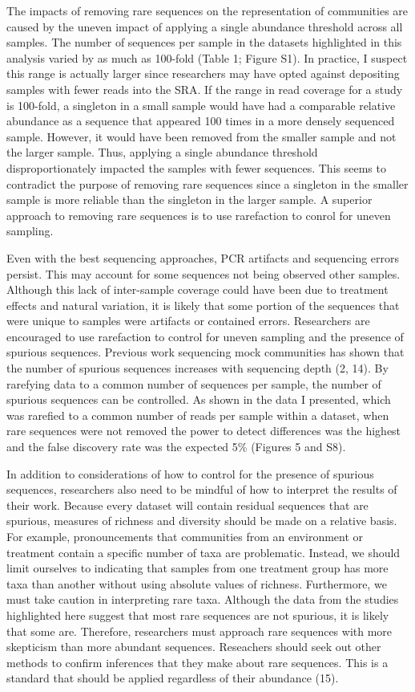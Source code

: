 \documentclass[
]{article}
\begin{document}
The impacts of removing rare sequences on the representation of
communities are caused by the uneven impact of applying a single
abundance threshold across all samples. The number of sequences per
sample in the datasets highlighted in this analysis varied by as much as
100-fold (Table 1; Figure S1). In practice, I suspect this range is
actually larger since researchers may have opted against depositing
samples with fewer reads into the SRA. If the range in read coverage for
a study is 100-fold, a singleton in a small sample would have had a
comparable relative abundance as a sequence that appeared 100 times in a
more densely sequenced sample. However, it would have been removed from
the smaller sample and not the larger sample. Thus, applying a single
abundance threshold disproportionately impacted the samples with fewer
sequences. This seems to contradict the purpose of removing rare
sequences since a singleton in the smaller sample is more reliable than
the singleton in the larger sample. A superior approach to removing rare
sequences is to use rarefaction to conrol for uneven sampling.

Even with the best sequencing approaches, PCR artifacts and sequencing
errors persist. This may account for some sequences not being observed
other samples. Although this lack of inter-sample coverage could have
been due to treatment effects and natural variation, it is likely that
some portion of the sequences that were unique to samples were artifacts
or contained errors. Researchers are encouraged to use rarefaction to
control for uneven sampling and the presence of spurious sequences.
Previous work sequencing mock communities has shown that the number of
spurious sequences increases with sequencing depth (2, 14). By rarefying
data to a common number of sequences per sample, the number of spurious
sequences can be controlled. As shown in the data I presented, which was
rarefied to a common number of reads per sample within a dataset, when
rare sequences were not removed the power to detect differences was the
highest and the false discovery rate was the expected 5\% (Figures 5 and
S8).

In addition to considerations of how to control for the presence of
spurious sequences, researchers also need to be mindful of how to
interpret the results of their work. Because every dataset will contain
residual sequences that are spurious, measures of richness and diversity
should be made on a relative basis. For example, pronouncements that
communities from an environment or treatment contain a specific number
of taxa are problematic. Instead, we should limit ourselves to
indicating that samples from one treatment group has more taxa than
another without using absolute values of richness. Furthermore, we must
take caution in interpreting rare taxa. Although the data from the
studies highlighted here suggest that most rare sequences are not
spurious, it is likely that some are. Therefore, researchers must
approach rare sequences with more skepticism than more abundant
sequences. Reseachers should seek out other methods to confirm
inferences that they make about rare sequences. This is a standard that
should be applied regardless of their abundance (15).
\end{document}
